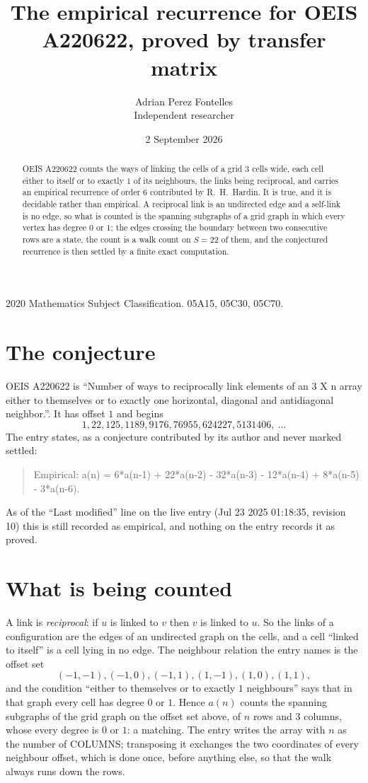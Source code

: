 \documentclass[11pt,a4paper]{article}
\title{The empirical recurrence for OEIS A220622, proved by transfer matrix}
\author{Adrian Perez Fontelles\\ \small Independent researcher}
\date{2 September 2026}
\theoremstyle{plain}
\theoremstyle{definition}
\begin{document}
\maketitle

\begin{abstract}
OEIS A220622 counts the ways of linking the cells of a grid $3$ cells wide, each cell either to
itself or to exactly $1$ of its neighbours, the links being reciprocal, and carries an
empirical recurrence of order $6$ contributed by R.~H.~Hardin. It is true, and it is
decidable rather than empirical. A reciprocal link is an undirected edge and a self-link is
no edge, so what is counted is the spanning subgraphs of a grid graph in which every vertex
has degree $0$ or $1$; the edges crossing the boundary between two consecutive rows are a
state, the count is a walk count on $S=22$ of them, and the conjectured recurrence is then
settled by a finite exact computation.
\end{abstract}

\noindent\small 2020 Mathematics Subject Classification. 05A15, 05C30, 05C70.\normalsize

\section{The conjecture}

OEIS A220622 is ``Number of ways to reciprocally link elements of an 3 X n array either to themselves or to exactly one horizontal, diagonal and antidiagonal neighbor.''. It has offset $1$ and begins
\[
1, 22, 125, 1189, 9176, 76955, 624227, 5131406,\ \dots
\]
The entry states, as a conjecture contributed by its author and never marked settled:
\begin{quote}
Empirical: a(n) = 6*a(n-1) + 22*a(n-2) - 32*a(n-3) - 12*a(n-4) + 8*a(n-5) - 3*a(n-6).
\end{quote}
As of the ``Last modified'' line on the live entry (Jul 23 2025 01:18:35, revision 10) this is still
recorded as empirical, and nothing on the entry records it as proved.

\section{What is being counted}

A link is \emph{reciprocal}: if $u$ is linked to $v$ then $v$ is linked to $u$. So the links
of a configuration are the edges of an undirected graph on the cells, and a cell ``linked to
itself'' is a cell lying in no edge. The neighbour relation the entry names is the offset set
\[
(-1,-1), (-1,0), (-1,1), (1,-1), (1,0), (1,1),
\]
and the condition ``either to themselves or to exactly $1$ neighbours'' says that in that
graph every cell has degree $0$ or $1$. Hence $a(n)$ counts the spanning subgraphs of the
grid graph on the offset set above, of $n$ rows and $3$ columns,
whose every degree is $0$ or $1$: a matching. The entry writes the array with $n$ as the number of COLUMNS; transposing it exchanges the two coordinates of every neighbour offset, which is done once, before anything else, so that the walk always runs down the rows.
\end{document}
